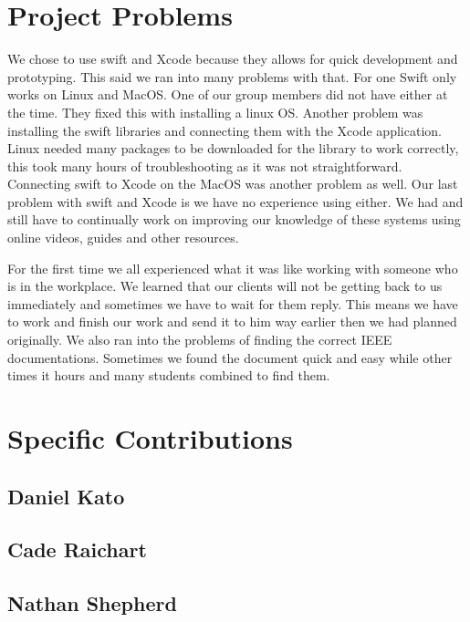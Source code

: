 \documentclass[onecolumn, draftclsnofoot,10pt, compsoc]{IEEEtran}
\begin{document}
\section{Project Problems}
We chose to use swift and Xcode because they allows for quick development and prototyping.
This said we ran into many problems with that. For one Swift only works on Linux and MacOS.
One of our group members did not have either at the time. They fixed this with installing a linux OS.
Another problem was installing the swift libraries and connecting them with the Xcode application.
Linux needed many packages to be downloaded for the library to work correctly, this took many hours of troubleshooting as it was not straightforward.
Connecting swift to Xcode on the MacOS was another problem as well.
Our last problem with swift and Xcode is we have no experience using either.
We had and still have to continually work on improving our knowledge of these systems using online videos, guides and other resources.

For the first time we all experienced what it was like working with someone who is in the workplace.
We learned that our clients will not be getting back to us immediately and sometimes we have to wait for them reply.
This means we have to work and finish our work and send it to him way earlier then we had planned originally.
We also ran into the problems of finding the correct IEEE documentations.
Sometimes we found the document quick and easy while other times it hours and many students combined to find them.

\section{Specific Contributions}
\subsection{Daniel Kato}

\subsection{Cade Raichart}

\subsection{Nathan Shepherd}
\end{document}
